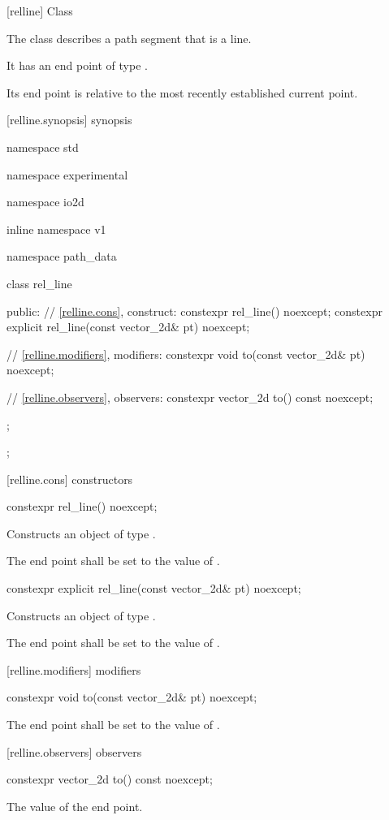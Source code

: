  [relline] {Class }

\pnum
{}
The class  describes a path segment that is a line.

\pnum
It has an end point of type .

\pnum
Its end point is relative to the most recently established current point.

 [relline.synopsis] { synopsis}

\begin{codeblock}
namespace std { namespace experimental { namespace io2d { inline namespace v1 {
  namespace path_data {
    class rel_line {
    public:
      // \ref{relline.cons}, construct:
      constexpr rel_line() noexcept;
      constexpr explicit rel_line(const vector_2d& pt) noexcept;

      // \ref{relline.modifiers}, modifiers:
      constexpr void to(const vector_2d& pt) noexcept;

      // \ref{relline.observers}, observers:
      constexpr vector_2d to() const noexcept;
    };
  };
} } } }
\end{codeblock}

 [relline.cons] { constructors}

\begin{itemdecl}
constexpr rel_line() noexcept;
\end{itemdecl}
\begin{itemdescr}
\pnum
\effects
Constructs an object of type .

\pnum
The end point shall be set to the value of .
\end{itemdescr}

\begin{itemdecl}
constexpr explicit rel_line(const vector_2d& pt) noexcept;
\end{itemdecl}
\begin{itemdescr}
\pnum
\effects
Constructs an object of type .

\pnum
The end point shall be set to the value of .
\end{itemdescr}

 [relline.modifiers]{ modifiers}

\begin{itemdecl}
constexpr void to(const vector_2d& pt) noexcept;
\end{itemdecl}
\begin{itemdescr}
\pnum
\effects
The end point shall be set to the value of .
\end{itemdescr}

 [relline.observers]{ observers}

\begin{itemdecl}
constexpr vector_2d to() const noexcept;
\end{itemdecl}
\begin{itemdescr}
\pnum
\returns
The value of the end point.
\end{itemdescr}
